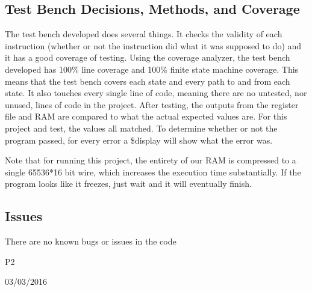 \documentclass[conference]{IEEEtran}
\begin{document}
\subsection{Test Bench Decisions, Methods, and Coverage}
The test bench developed does several things. 
It checks the validity of each instruction (whether or not the instruction did what it was supposed to do) and it has a good coverage of testing. 
Using the coverage analyzer, the test bench developed has 100\% line coverage and 100\% finite state machine coverage. 
This means that the test bench covers each state and every path to and from each state. 
It also touches every single line of code, meaning there are no untested, nor unused, lines of code in the project.
After testing, the outputs from the register file and RAM are compared to what the actual expected values are.
For this project and test, the values all matched.
To determine whether or not the program passed, for every error a \$display will show what the error was.

Note that for running this project, the entirety of our RAM is compressed to a single 65536*16 bit wire, which increases the execution time substantially.
If the program looks like it freezes, just wait and it will eventually finish.


\subsection{Issues}
There are no known bugs or issues in the code

\hfill P2
 
\hfill 03/03/2016
\end{document}

